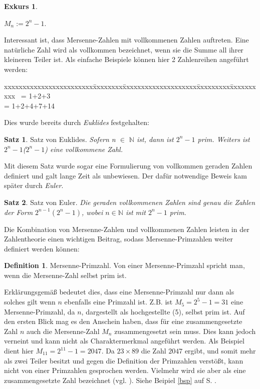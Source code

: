 \documentclass[12pt,a4paper]{article}
\theoremstyle{definition}
\newtheorem{defi}{Definition}[section]
\newtheorem{satz}{Satz}[subsection]
\newtheorem{exkurs}{Exkurs}
\begin{document}
\begin{exkurs}
\begin{center}
$M_n := 2^n-1$.
\end{center}
Interessant ist, dass Mersenne-Zahlen mit vollkommenen Zahlen auftreten.
Eine natürliche Zahl wird als vollkommen bezeichnet, wenn sie die Summe all ihrer kleineren Teiler ist.
Als einfache Beispiele können hier 2 Zahlenreihen angeführt werden:
\begin{tabbing}
xxxxxxxxxxxxxxxxxxxxxxxx\=xxxxxxxx\=xxxxxxxxxxxxxxxxxxxx\=xxxxxxxxx\=xxxxxxxxxx\kill
{} \ = 1+2+3 \\
 = 1+2+4+7+14
\end{tabbing}
Dies wurde bereits durch \textit{Euklides} festgehalten:
\begin{satz}{Satz von Euklides}.\newline
\textit{Sofern n $\in$ $\mathbb{N}$ ist, dann ist $2^n-1$ prim.
Weiters ist $2^n-1$($2^n-1$) eine vollkommene Zahl.} \autocite[168]{RempeGillen2009}
\end{satz}

Mit diesem Satz wurde sogar eine Formulierung von vollkommen geraden Zahlen definiert und galt lange Zeit als unbewiesen.
Der dafür notwendige Beweis kam später durch \textit{Euler}.
\begin{satz}{Satz von Euler}.\newline
\textit{Die geraden vollkommenen Zahlen sind genau die Zahlen der\newline
Form $2^{n-1}(2^n-1)$, wobei $n \in \mathbb{N}$ ist mit $2^n-1$ prim.} \autocite[168]{RempeGillen2009}
\end{satz}

Die Kombination von Mersenne-Zahlen und vollkommenen Zahlen leisten in der Zahlentheorie einen wichtigen Beitrag, sodass Mersenne-Primzahlen weiter definiert werden können:
\begin{defi}{Mersenne-Primzahl}.\newline
Von einer Mersenne-Primzahl spricht man, wenn die Mersenne-Zahl selbst prim ist.
\end{defi}

Erklärungsgemäß bedeutet dies, dass eine Mersenne-Primzahl nur dann als solches gilt wenn $n$ ebenfalls eine Primzahl ist.
Z.B. ist $M_5 = 2^{5}-1 = 31$ eine Mersenne-Primzahl, da $n$, dargestellt als hochgestellte (5), selbst prim ist.
Auf den ersten Blick mag es den Anschein haben, dass für eine zusammengesetzte Zahl $n$ auch die Mersenne-Zahl $M_n$ zusammengesetzt sein muss.
Dies kann jedoch verneint und kann nicht als Charaktermerkmal angeführt werden. Als Beispiel dient hier $M_{11} = 2^{11}-1 = 2047$.
Da $23 \times 89$ die Zahl $2047$ ergibt, und somit mehr als zwei Teiler besitzt und gegen die Definition der Primzahlen verstößt, kann nicht von einer Primzahlen gesprochen werden.
Vielmehr wird sie aber als eine zusammengesetzte Zahl bezeichnet (vgl. \cite[168--169]{RempeGillen2009}).
Siehe Beipiel \ref{bsp} auf S. \pageref{bsp}.


\end{exkurs}
\end{document}
